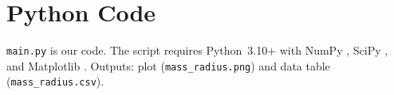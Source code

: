 \documentclass[12pt,letterpaper]{article}
\begin{document}
\clearpage
\appendix
\section{Python   Code}
\label{app:code}

\texttt{main.py} is our code. The script requires Python~3.10+ with NumPy \citep{harris2020},
SciPy \citep{virtanen2020}, and Matplotlib \citep{hunter2007}.
Outputs: plot (\texttt{mass\_radius.png}) and data table (\texttt{mass\_radius.csv}).




\end{document}
